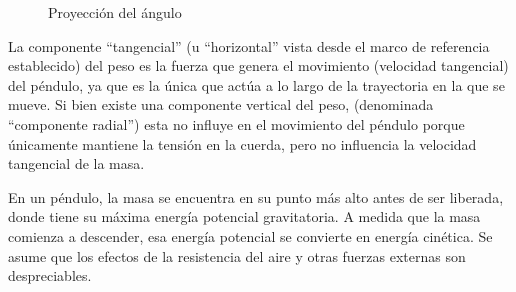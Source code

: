 \documentclass[letterpaper]{report}
\numberwithin{table}{section}
\begin{document}
\begin{figure}[ht]
  \centering
  \caption{Proyección del ángulo}
\end{figure}

La componente “tangencial” (u “horizontal” vista desde el marco de
referencia establecido) del peso es la fuerza que genera el
movimiento (velocidad tangencial) del péndulo, ya que es la única que
actúa a lo largo de la trayectoria en la que se mueve. Si bien existe
una componente vertical del peso, (denominada “componente radial”)
esta no influye en el movimiento del péndulo porque únicamente
mantiene la tensión en la cuerda, pero no influencia la velocidad
tangencial de la masa.

En un péndulo, la masa se encuentra en su punto más alto antes de ser
liberada, donde tiene su máxima energía potencial gravitatoria. A
medida que la masa comienza a descender, esa energía potencial se
convierte en energía cinética. Se asume que los efectos de la
resistencia del aire y otras fuerzas externas son despreciables.
\end{document}
